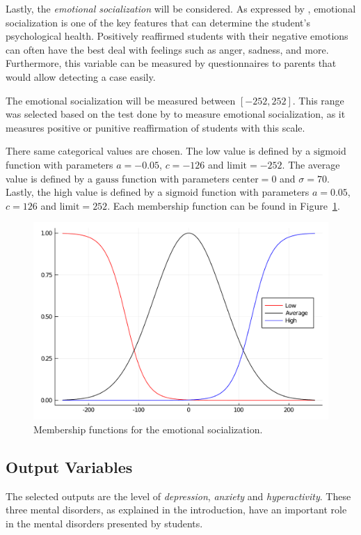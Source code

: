 \documentclass[conference]{IEEEtran}
\theoremstyle{definition}
\theoremstyle{remark}
\theoremstyle{remark}
\begin{document}
Lastly, the \textit{emotional socialization} will be considered. As expressed by
\textcite{horner2013}, emotional socialization is one of the key features that
can determine the student's psychological health. Positively reaffirmed students
with their negative emotions can often have the best deal with feelings such as
anger, sadness, and more. Furthermore, this variable can be measured by
questionnaires to parents that would allow detecting a case easily.

The emotional socialization will be measured between $[-252, 252]$. This range
was selected based on the test done by \textcite{fabes2001} to measure emotional
socialization, as it measures positive or punitive reaffirmation of students
with this scale.

There same categorical values are chosen. The low value is defined by a
$\mathrm{sigmoid}$ function with parameters $a=-0.05$, $c=-126$ and
$\mathrm{limit} = -252$. The average value is defined by a $\mathrm{gauss}$
function with parameters $\mathrm{center}=0$ and $\sigma = 70$. Lastly, the high
value is defined by a $\mathrm{sigmoid}$ function with parameters $a = 0.05$,
$c=126$ and $\mathrm{limit} = 252$. Each membership function can be found in
Figure~\ref{fig:es_mf}.

\begin{figure}[t]
  \centering
  \includegraphics[scale=.3]{figs/es.pdf}
  \caption{Membership functions for the emotional socialization.}
  \label{fig:es_mf}
\end{figure}

\subsection{Output Variables}
The selected outputs are the level of \textit{depression}, \textit{anxiety} and
\textit{hyperactivity}. These three mental disorders, as explained in the
introduction, have an important role in the mental disorders presented by
students.
\end{document}
